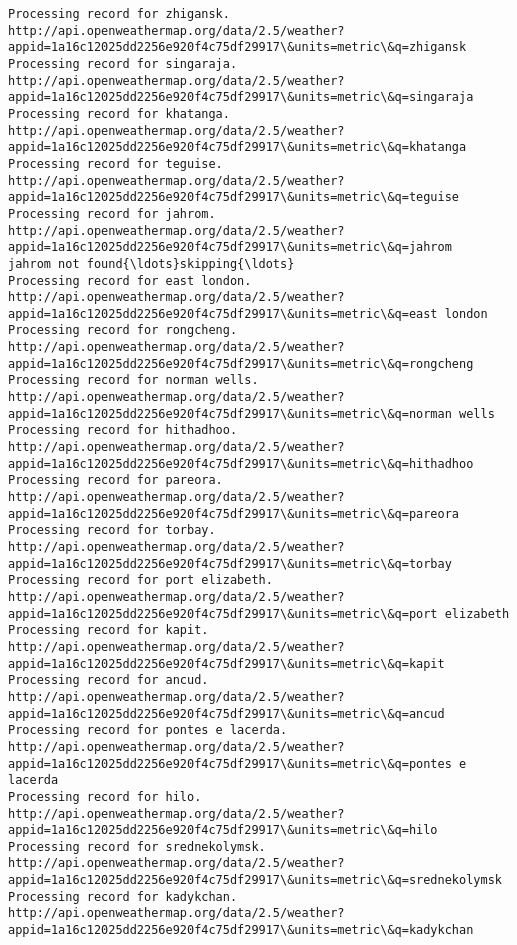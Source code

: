 \documentclass[11pt]{article}
\begin{document}
\begin{Verbatim}[commandchars=\\\{\}]
Processing record for zhigansk.
http://api.openweathermap.org/data/2.5/weather?appid=1a16c12025dd2256e920f4c75df29917\&units=metric\&q=zhigansk
Processing record for singaraja.
http://api.openweathermap.org/data/2.5/weather?appid=1a16c12025dd2256e920f4c75df29917\&units=metric\&q=singaraja
Processing record for khatanga.
http://api.openweathermap.org/data/2.5/weather?appid=1a16c12025dd2256e920f4c75df29917\&units=metric\&q=khatanga
Processing record for teguise.
http://api.openweathermap.org/data/2.5/weather?appid=1a16c12025dd2256e920f4c75df29917\&units=metric\&q=teguise
Processing record for jahrom.
http://api.openweathermap.org/data/2.5/weather?appid=1a16c12025dd2256e920f4c75df29917\&units=metric\&q=jahrom
jahrom not found{\ldots}skipping{\ldots}
Processing record for east london.
http://api.openweathermap.org/data/2.5/weather?appid=1a16c12025dd2256e920f4c75df29917\&units=metric\&q=east london
Processing record for rongcheng.
http://api.openweathermap.org/data/2.5/weather?appid=1a16c12025dd2256e920f4c75df29917\&units=metric\&q=rongcheng
Processing record for norman wells.
http://api.openweathermap.org/data/2.5/weather?appid=1a16c12025dd2256e920f4c75df29917\&units=metric\&q=norman wells
Processing record for hithadhoo.
http://api.openweathermap.org/data/2.5/weather?appid=1a16c12025dd2256e920f4c75df29917\&units=metric\&q=hithadhoo
Processing record for pareora.
http://api.openweathermap.org/data/2.5/weather?appid=1a16c12025dd2256e920f4c75df29917\&units=metric\&q=pareora
Processing record for torbay.
http://api.openweathermap.org/data/2.5/weather?appid=1a16c12025dd2256e920f4c75df29917\&units=metric\&q=torbay
Processing record for port elizabeth.
http://api.openweathermap.org/data/2.5/weather?appid=1a16c12025dd2256e920f4c75df29917\&units=metric\&q=port elizabeth
Processing record for kapit.
http://api.openweathermap.org/data/2.5/weather?appid=1a16c12025dd2256e920f4c75df29917\&units=metric\&q=kapit
Processing record for ancud.
http://api.openweathermap.org/data/2.5/weather?appid=1a16c12025dd2256e920f4c75df29917\&units=metric\&q=ancud
Processing record for pontes e lacerda.
http://api.openweathermap.org/data/2.5/weather?appid=1a16c12025dd2256e920f4c75df29917\&units=metric\&q=pontes e lacerda
Processing record for hilo.
http://api.openweathermap.org/data/2.5/weather?appid=1a16c12025dd2256e920f4c75df29917\&units=metric\&q=hilo
Processing record for srednekolymsk.
http://api.openweathermap.org/data/2.5/weather?appid=1a16c12025dd2256e920f4c75df29917\&units=metric\&q=srednekolymsk
Processing record for kadykchan.
http://api.openweathermap.org/data/2.5/weather?appid=1a16c12025dd2256e920f4c75df29917\&units=metric\&q=kadykchan

\end{Verbatim}
\end{document}
